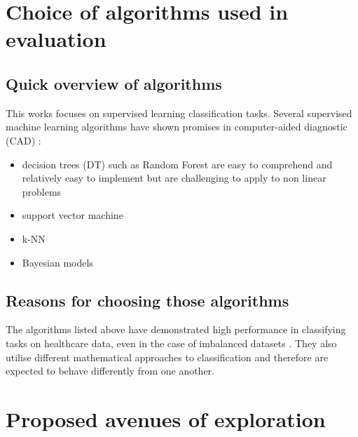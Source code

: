 \section{Choice of algorithms used in evaluation}
\subsection{Quick overview of algorithms}
This works focuses on supervised learning classification tasks. Several supervised machine learning algorithms have shown promises in computer-aided diagnostic (CAD) \citep{Dua:2014dz}:
\begin{itemize}
    \item decision trees (DT) such as Random Forest are easy to comprehend and relatively easy to implement but are challenging to apply to non linear problems \citep{Gray:2013eh}
    \item support vector machine \citep{Naraei:ct}
    \item k-NN \citep{Liu:2011dz}
    \item Bayesian models \citep{Dangare:ut}
\end{itemize}

\subsection{Reasons for choosing those algorithms}
The algorithms listed above have demonstrated high performance in classifying tasks on healthcare data, even in the case of imbalanced datasets \citep{Dua:2014dz}. They also utilise different mathematical approaches to classification and therefore are expected to behave differently from one another.



\section{Proposed avenues of exploration}
